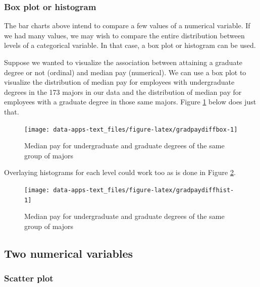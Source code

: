 \documentclass[
]{book}
\begin{document}
\hypertarget{box-plot-or-histogram}{%
\subsubsection{Box plot or histogram}\label{box-plot-or-histogram}}

The bar charts above intend to compare a few values of a numerical variable. If we had many values, we may wish to compare the entire distribution between levels of a categorical variable. In that case, a box plot or histogram can be used.

Suppose we wanted to visualize the association between attaining a graduate degree or not (ordinal) and median pay (numerical). We can use a box plot to visualize the distribution of median pay for employees with undergraduate degrees in the 173 majors in our data and the distribution of median pay for employees with a graduate degree in those same majors. Figure \ref{fig:gradpaydiffbox} below does just that.

\begin{figure}

{\centering \texttt{[image: data-apps-text\_files/figure-latex/gradpaydiffbox-1]} 

}

\caption{Median pay for undergraduate and graduate degrees of the same group of majors}\label{fig:gradpaydiffbox}
\end{figure}

Overlaying histograms for each level could work too as is done in Figure \ref{fig:gradpaydiffhist}.

\begin{figure}

{\centering \texttt{[image: data-apps-text\_files/figure-latex/gradpaydiffhist-1]} 

}

\caption{Median pay for undergraduate and graduate degrees of the same group of majors}\label{fig:gradpaydiffhist}
\end{figure}

\hypertarget{two-numerical-variables}{%
\subsection{Two numerical variables}\label{two-numerical-variables}}

\hypertarget{scatter-plot}{%
\subsubsection{Scatter plot}\label{scatter-plot}}
\end{document}
